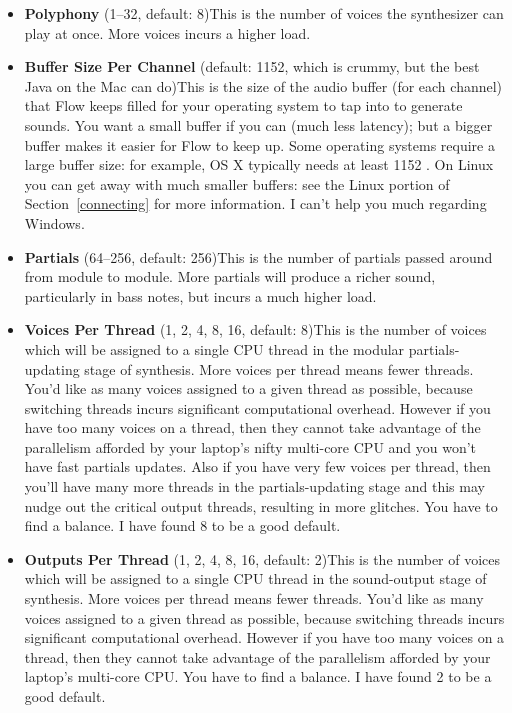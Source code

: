 \documentclass{article}
\newcommand\name{Flow}
\begin{document}
\begin{itemize}
\item {\bf Polyphony} (1--32, default: 8)\qquad This is the number of voices the synthesizer can play at once.  More voices incurs a higher load.

\item {\bf Buffer Size Per Channel} (default: 1152, which is crummy, but the best Java on the Mac can do)\qquad This is the size of the audio buffer (for each channel) that {\name} keeps filled for your operating system to tap into to generate sounds.  You want a small buffer if you can (much less latency); but a bigger buffer makes it easier for Flow to keep up.  Some operating systems require a large buffer size: for example, OS X typically needs at least 1152 . On Linux you can get away with much smaller buffers: see the Linux portion of Section~\ref{connecting} for more information.  I can't help you much regarding Windows.

\item {\bf Partials} (64--256, default: 256)\qquad This is the number of partials passed around from module to module.  More partials will produce a richer sound, particularly in bass notes, but incurs a much higher load.

\item {\bf Voices Per Thread} (1, 2, 4, 8, 16, default: 8)\qquad This is the number of voices which will be assigned to a single CPU thread in the modular partials-updating stage of synthesis.  More voices per thread means fewer threads.  You'd like as many voices assigned to a given thread as possible, because switching threads incurs significant computational overhead.  However if you have too many voices on a thread, then they cannot take advantage of the parallelism afforded by your laptop's nifty multi-core CPU and you won't have fast partials updates.  Also if you have very few voices per thread, then you'll have many more threads in the partials-updating stage and this may nudge out the critical output threads, resulting in more glitches.  You have to find a balance.   I have found 8 to be a good default.

\item {\bf Outputs Per Thread} (1, 2, 4, 8, 16, default: 2)\qquad This is the number of voices which will be assigned to a single CPU thread in the sound-output stage of synthesis.  More voices per thread means fewer threads.  You'd like as many voices assigned to a given thread as possible, because switching threads incurs significant computational overhead.  However if you have too many voices on a thread, then they cannot take advantage of the parallelism afforded by your laptop's multi-core CPU.  You have to find a balance.    I have found 2 to be a good default.


\end{itemize}
\end{document}
